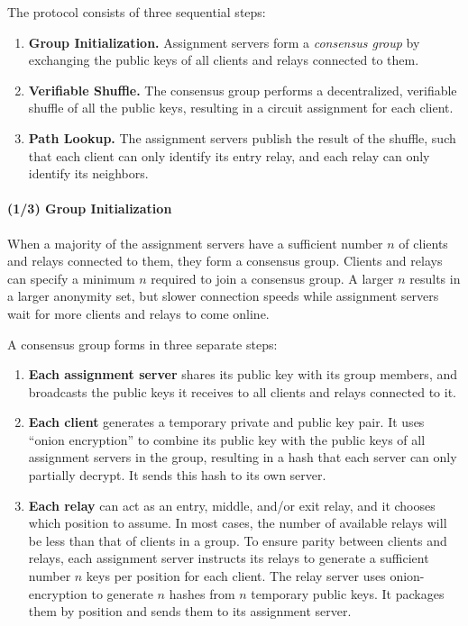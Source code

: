 The protocol consists of three sequential steps:

\begin{enumerate}
\item \textbf{Group Initialization.} Assignment servers form a \textit{consensus group} by exchanging the public keys of all clients and relays connected to them. 
\item \textbf{Verifiable Shuffle.} The consensus group performs a decentralized, 
verifiable shuffle of all the public keys, resulting in a circuit assignment for
each client.
\item \textbf{Path Lookup.} The assignment servers publish the result of the 
shuffle, such that each client can only identify its entry relay, and each relay
can only identify its neighbors. 
\end{enumerate}


\paragraph{(1/3) Group Initialization}

When a majority of the assignment servers have a sufficient number $n$ of clients
and relays connected to them, they form a consensus group. Clients and relays can specify a minimum $n$ required to join a consensus group. A larger $n$ results in a larger anonymity set, but slower connection speeds while assignment servers
wait for more clients and relays to come online.

A consensus group forms in three separate steps:

\begin{enumerate} 
\item \textbf{Each assignment server} shares its public key with its group members, and
broadcasts the public keys it receives to all clients and relays connected to it. 

\item \textbf{Each client} generates a temporary private and public key pair. It
uses ``onion encryption'' to combine its public key with the public keys of all assignment servers in the group, resulting in a hash that each server can only
partially decrypt. It sends this hash to its own server.

\item \textbf{Each relay} can act as an entry, middle, and/or exit relay, and it chooses which position to assume. In most cases, the number of available relays
will be less than that of clients in a group. To ensure parity between clients
and relays, each assignment server instructs its relays to generate a sufficient
number $n$ keys per position for each client. The relay server uses onion-encryption to generate $n$ hashes from $n$ temporary public keys. It packages them by position and sends them to its assignment server.
\end{enumerate}

